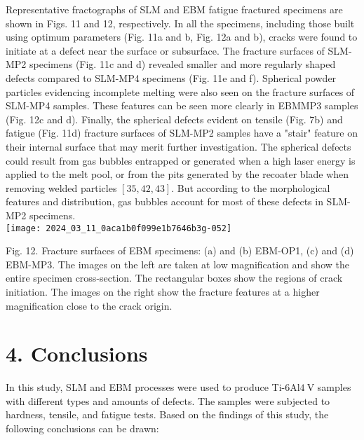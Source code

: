 \documentclass[10pt]{article}
\begin{document}
Representative fractographs of SLM and EBM fatigue fractured specimens are shown in Figs. 11 and 12, respectively. In all the specimens, including those built using optimum parameters (Fig. 11a and b, Fig. 12a and b), cracks were found to initiate at a defect near the surface or subsurface. The fracture surfaces of SLM-MP2 specimens (Fig. 11c and d) revealed smaller and more regularly shaped defects compared to SLM-MP4 specimens (Fig. 11e and f). Spherical powder particles evidencing incomplete melting were also seen on the fracture surfaces of SLM-MP4 samples. These features can be seen more clearly in EBMMP3 samples (Fig. 12c and d). Finally, the spherical defects evident on tensile (Fig. 7b) and fatigue (Fig. 11d) fracture surfaces of SLM-MP2 samples have a "stair" feature on their internal surface that may merit further investigation. The spherical defects could result from gas bubbles entrapped or generated when a high laser energy is applied to the melt pool, or from the pits generated by the recoater blade when removing welded particles $[35,42,43]$. But according to the morphological features and distribution, gas bubbles account for most of these defects in SLM-MP2 specimens.\\
\texttt{[image: 2024\_03\_11\_0aca1b0f099e1b7646b3g-052]}

Fig. 12. Fracture surfaces of EBM specimens: (a) and (b) EBM-OP1, (c) and (d) EBM-MP3. The images on the left are taken at low magnification and show the entire specimen cross-section. The rectangular boxes show the regions of crack initiation. The images on the right show the fracture features at a higher magnification close to the crack origin.

\section*{4. Conclusions}
In this study, SLM and EBM processes were used to produce Ti-6Al$4 \mathrm{~V}$ samples with different types and amounts of defects. The samples were subjected to hardness, tensile, and fatigue tests. Based on the findings of this study, the following conclusions can be drawn:
\end{document}
